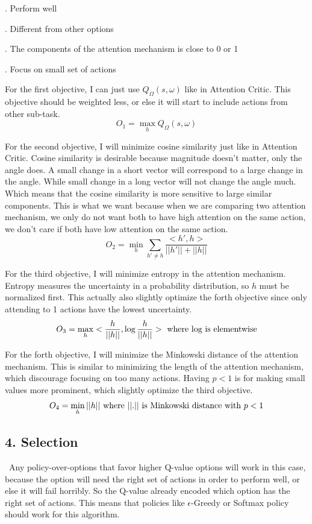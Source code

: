 \documentclass{article}
\begin{document}
	. Perform well
	
	. Different from other options
	
	. The components of the attention mechanism is close to 0 or 1
	
	. Focus on small set of actions
	
	\quad For the first objective, I can just use $Q_\Omega(s,\omega)$ like in Attention Critic. This objective should be weighted less, or else it will start to include actions from other sub-task. $$O_1=\max_h Q_\Omega(s,\omega)$$
	
	\quad For the second objective, I will minimize cosine similarity just like in Attention Critic. Cosine similarity is desirable because magnitude doesn't matter, only the angle does. A small change in a short vector will correspond to a large change in the angle. While small change in a long vector will not change the angle much. Which means that the cosine similarity is more sensitive to large similar components. This is what we want because when we are comparing two attention mechanism, we only do not want both to have high attention on the same action, we don't care if both have low attention on the same action.$$O_2 = \min_h \sum_{h' \neq h} \frac{<h', h>}{||h'||+||h||}$$
	
	\quad For the third objective, I will minimize entropy in the attention mechanism. Entropy measures the uncertainty in a probability distribution, so $h$ must be normalized first. This actually also slightly optimize the forth objective since only attending to 1 actions have the lowest uncertainty.$$O_3 = \max_h <\frac{h}{||h||},\log \frac{h}{||h||}> \textnormal{ where log is elementwise}$$
	
	\quad For the forth objective, I will minimize the Minkowski distance of the attention mechanism. This is similar to minimizing the length of the attention mechanism, which discourage focusing on too many actions. Having $p<1$ is for making small values more prominent, which slightly optimize the third objective.$$O_4 = \min_h ||h|| \textnormal{ where }||.||\textnormal{ is Minkowski distance with } p<1$$
	
	\subsection*{4. Selection}
	\qquad \ Any policy-over-options that favor higher Q-value options will work in this case, because the option will need the right set of actions in order to perform well, or else it will fail horribly. So the Q-value already encoded which option has the right set of actions. This means that policies like $\epsilon$-Greedy or Softmax policy should work for this algorithm.
	
\end{document}
